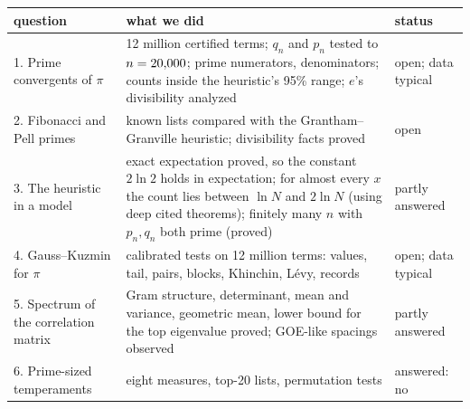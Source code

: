 \noindent\begin{minipage}{\textwidth}
\centering
{}
\label{tab:oq-status}
\small
\begin{tabularx}{\textwidth}{lXl}
\toprule
question & what we did & status \\
\midrule
1. Prime convergents of $\pi$ & 12 million certified terms; $q_n$ and $p_n$ tested to $n = 20{,}000$; \OqPiPn{} prime numerators, \OqPiQn{} denominators; counts inside the heuristic's 95\% range; $e$'s divisibility analyzed & open; data typical \\
2. Fibonacci and Pell primes & known lists compared with the Grantham--Granville heuristic; divisibility facts proved & open \\
3. The heuristic in a model & exact expectation proved, so the constant $2\ln 2$ holds in expectation; for almost every $x$ the count lies between $\ln N$ and $2\ln N$ (using deep cited theorems); finitely many $n$ with $p_n, q_n$ both prime (proved) & partly answered \\
4. Gauss--Kuzmin for $\pi$ & calibrated tests on 12 million terms: values, tail, pairs, blocks, Khinchin, Lévy, records & open; data typical \\
5. Spectrum of the correlation matrix & Gram structure, determinant, mean and variance, geometric mean, lower bound for the top eigenvalue proved; GOE-like spacings observed & partly answered \\
6. Prime-sized temperaments & eight measures, top-20 lists, permutation tests & answered: no \\
\bottomrule
\end{tabularx}
\end{minipage}
\medskip

